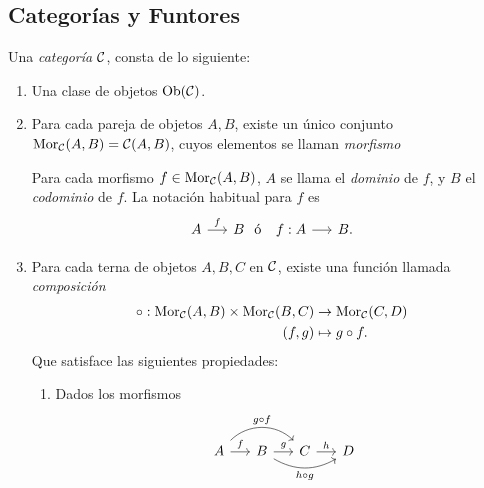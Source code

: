 \subsection{Categorías y Funtores}
\begin{definicion}
    Una \textit{categoría} $\mathcal{C}$, consta de lo siguiente:
    \begin{enumerate}[label=(\arabic*)]
        \item Una clase de objetos $\text{Ob}({\mathcal{C}})$.
        \item Para cada pareja de objetos $A,B$, existe un único conjunto $\mathrm{Mor}_{\mathcal{C}}(A,B)=\mathcal{C}(A,B)$, cuyos elementos se llaman \textit{morfismo} 
        
        Para cada morfismo $f\in \mathrm{Mor}_{\mathcal{C}}(A,B)$, $A$ se llama el \textit{dominio} de $f$, y $B$ el \textit{codominio} de $f$. La notación habitual para $f$ es\hspace{-1cm}
            \begin{equation*}
                \begin{tikzcd}[column sep=0.5cm,row sep=1.5cm]  
                    A \ar[r,"f"] & B
                \end{tikzcd} \hspace{1mm} \text{ó } \hspace{1mm} \begin{tikzcd}[column sep=0.5cm,row sep=1.5cm]  
                    f:A \ar[r] & B.
                \end{tikzcd} 
            \end{equation*}
        \item  Para cada terna de objetos $A,B,C$ en $\mathcal{C}$, existe una función llamada \textit{composición} 
          \begin{align*}
                \circ:\mathrm{Mor}_{\mathcal{C}}(A,B)\times\mathrm{Mor}_{\mathcal{C}}(B,C) &\to \mathrm{Mor}_{\mathcal{C}}(C,D)  \\
                (f,g) &\mapsto g\circ f.
          \end{align*}       
          Que satisface las siguientes propiedades:
          \begin{enumerate}[label=(\alph*),ref=\arabic{enumi}.(\alph*)]
              \item Dados los morfismos
          $$
                \begin{tikzcd}[column sep=0.5cm,row sep=1.5cm]  
                    A \ar[r,"f"] \ar[rr,"g\circ f", bend left=45] & B\ar[r,"g"]\ar[rr,"h\circ g"', bend right] & C\ar[r,"h"] & D
                \end{tikzcd}
          $$

\end{enumerate}
\end{enumerate}
\end{definicion}
